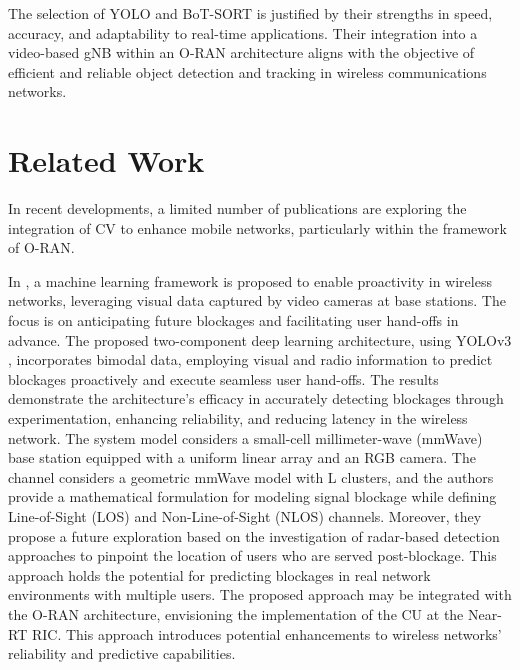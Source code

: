 The selection of YOLO and BoT-SORT is justified by their strengths in speed, accuracy, and adaptability to real-time applications. Their integration into a video-based gNB within an O-RAN architecture aligns with the objective of efficient and reliable object detection and tracking in wireless communications networks.



\section{Related Work}\label{sec:rel_work}
In recent developments, a limited number of publications are exploring the integration of CV to enhance mobile networks, particularly within the framework of O-RAN.

In \cite{Block_predict}, a machine learning framework is proposed to enable proactivity in wireless networks, leveraging visual data captured by video cameras at base stations. The focus is on anticipating future blockages and facilitating user hand-offs in advance. The proposed two-component deep learning architecture, using YOLOv3 \cite{YOLOv3}, incorporates bimodal data, employing visual and radio information to predict blockages proactively and execute seamless user hand-offs. The results demonstrate the architecture's efficacy in accurately detecting blockages through experimentation, enhancing reliability, and reducing latency in the wireless network. The system model considers a small-cell millimeter-wave (mmWave) base station equipped with a uniform linear array and an RGB camera. The channel considers a geometric mmWave model with L clusters, and the authors provide a mathematical formulation for modeling signal blockage while defining Line-of-Sight (LOS) and Non-Line-of-Sight (NLOS) channels.
Moreover, they propose a future exploration based on the investigation of radar-based detection approaches to pinpoint the location of users who are served post-blockage. This approach holds the potential for predicting blockages in real network environments with multiple users. The proposed approach may be integrated with the O-RAN architecture, envisioning the implementation of the CU at the Near-RT RIC. This approach introduces potential enhancements to wireless networks' reliability and predictive capabilities.

